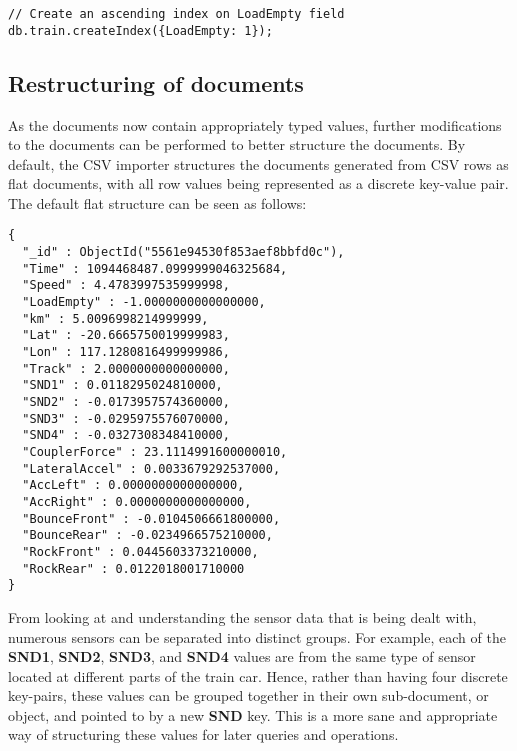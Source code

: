 \documentclass[a4paper,11pt]{article}
\begin{document}
\begin{lstlisting}[caption=Creating an index on ``LoadEmpty'' key in ``train'' collection.]
// Create an ascending index on LoadEmpty field
db.train.createIndex({LoadEmpty: 1});
\end{lstlisting}



\subsection{Restructuring of documents} %
\label{sub:restructuring_of_documents}

As the documents now contain appropriately typed values, further modifications to the documents can be performed
to better structure the documents. By default, the CSV importer structures the documents generated from CSV rows as flat
documents, with all row values being represented as a discrete key-value pair. The default flat structure can be seen as
follows:

\begin{lstlisting}[caption=Original ``flat'' document structure.]
{
  "_id" : ObjectId("5561e94530f853aef8bbfd0c"),
  "Time" : 1094468487.0999999046325684,
  "Speed" : 4.4783997535999998,
  "LoadEmpty" : -1.0000000000000000,
  "km" : 5.0096998214999999,
  "Lat" : -20.6665750019999983,
  "Lon" : 117.1280816499999986,
  "Track" : 2.0000000000000000,
  "SND1" : 0.0118295024810000,
  "SND2" : -0.0173957574360000,
  "SND3" : -0.0295975576070000,
  "SND4" : -0.0327308348410000,
  "CouplerForce" : 23.1114991600000010,
  "LateralAccel" : 0.0033679292537000,
  "AccLeft" : 0.0000000000000000,
  "AccRight" : 0.0000000000000000,
  "BounceFront" : -0.0104506661800000,
  "BounceRear" : -0.0234966575210000,
  "RockFront" : 0.0445603373210000,
  "RockRear" : 0.0122018001710000
}
\end{lstlisting}

From looking at and understanding the
sensor data that is being dealt with, numerous sensors can be separated into distinct groups. For example, each of the
\textbf{SND1}, \textbf{SND2}, \textbf{SND3}, and \textbf{SND4} values are from the same type of sensor located at different
parts of the train car. Hence, rather than having four discrete key-pairs, these values can be grouped together in their
own sub-document, or object, and pointed to by a new \textbf{SND} key. This is a more sane and appropriate way of
structuring these values for later queries and operations.
\end{document}
